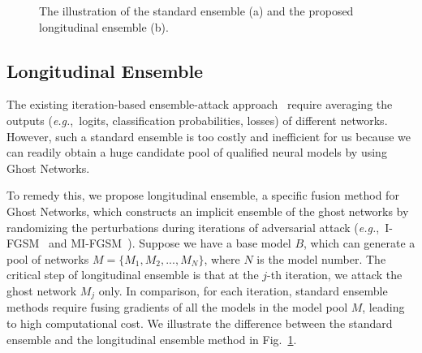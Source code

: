 \documentclass[letterpaper]{article} %
\def\eg{\emph{e.g.}}
\begin{document}
\begin{figure}[tb]
\centering
{}

\caption{The illustration of the standard ensemble (a) and the proposed longitudinal ensemble (b).}
\label{fig:long_method}
\end{figure}

\subsection{Longitudinal Ensemble} \label{sec:longitudinal} 
The existing iteration-based ensemble-attack approach~\cite{liu2016delving} require averaging the outputs (\eg,~logits, classification probabilities, losses) of different networks. However, such a standard ensemble is too costly and inefficient for us because we can readily obtain a huge candidate pool of qualified neural models by using Ghost Networks.

To remedy this, we propose longitudinal ensemble, a specific fusion method for Ghost Networks, which constructs an implicit ensemble of the ghost networks by randomizing the perturbations during iterations of adversarial attack (\eg,~I-FGSM~\cite{kurakin2016adversarial} and MI-FGSM~\cite{dong2017boosting}). Suppose we have a base model $B$, which can generate a pool of networks $M=\{M_1,M_2,...,M_N\}$, where $N$ is the model number. The critical step of longitudinal ensemble is that at the $j$-th iteration, we attack the ghost network $M_j$ only. In comparison, for each iteration, standard ensemble methods require fusing gradients of all the models in the model pool $M$, leading to high computational cost. We illustrate the difference between the standard ensemble and the longitudinal ensemble method in Fig.~\ref{fig:long_method}. 
\end{document}
